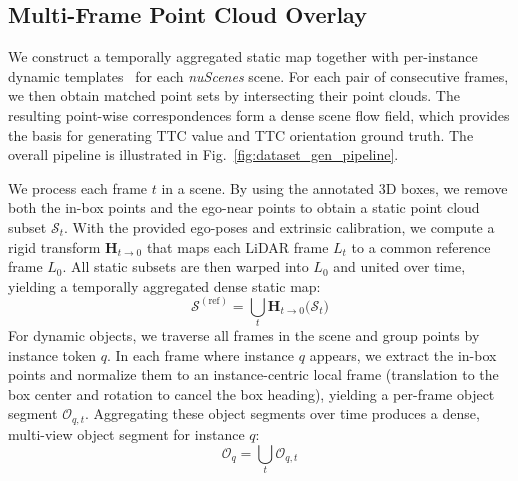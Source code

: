 \documentclass[journal]{IEEEtran}
\begin{document}
\subsection{Multi-Frame Point Cloud Overlay}
\label{sec:multi-frame}

We construct a temporally aggregated static map together with per-instance dynamic templates~\cite{wei2023surroundocc} for each \textit{nuScenes} scene. For each pair of consecutive frames, we then obtain matched point sets by intersecting their point clouds. The resulting point-wise correspondences form a dense scene flow field, which provides the basis for generating TTC value and TTC orientation ground truth. The overall pipeline is illustrated in Fig.~\ref{fig:dataset_gen_pipeline}. 

We process each frame \(t\) in a scene. By using the annotated 3D boxes, we remove both the in-box points and the ego-near points to obtain a static point cloud subset \(\mathcal{S}_t\). With the provided ego-poses and extrinsic calibration, we compute a rigid transform \(\mathbf{H}_{t\rightarrow 0}\) that maps each LiDAR frame \(L_t\) to a common reference frame \(L_0\). All static subsets are then warped into \(L_0\) and united over time, yielding a temporally aggregated dense static map:
\begin{equation}
\label{eq:static_map_points}
\mathcal{S}^{(\mathrm{ref})} = \bigcup_{t} \mathbf{H}_{t\rightarrow 0}\!\bigl(\mathcal{S}_t\bigr)
\end{equation}
For dynamic objects, we traverse all frames in the scene and group points by instance token \(q\). In each frame where instance \(q\) appears, we extract the in-box points and normalize them to an instance-centric local frame (translation to the box center and rotation to cancel the box heading), yielding a per-frame object segment \(\mathcal{O}_{q,t}\). Aggregating these object segments over time produces a dense, multi-view object segment for instance \(q\): 
\begin{equation}
\label{eq:object_segment_points}
\mathcal{O}_{q}=\bigcup_{t}\mathcal{O}_{q,t}
\end{equation}
\end{document}
